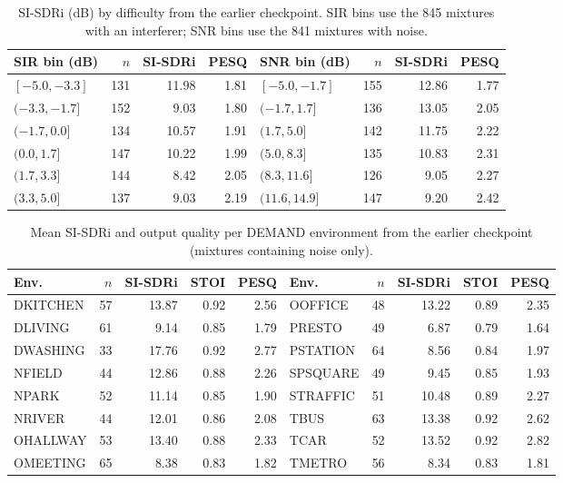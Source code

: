 \documentclass[11pt,a4paper]{article}
\newcommand{\sisdri}{SI-SDRi}
\begin{document}
\begin{table}[htbp]
\centering\footnotesize
\caption{\sisdri{} (dB) by difficulty from the earlier checkpoint. SIR bins use the 845 mixtures
with an interferer; SNR bins use the 841 mixtures with noise.}
\label{tab:difficulty}
\begin{tabular}{@{}lrrr@{\hspace{1.2cm}}lrrr@{}}
\toprule
SIR bin (dB) & $n$ & \sisdri{} & PESQ & SNR bin (dB) & $n$ & \sisdri{} & PESQ\\
\midrule
$[-5.0,-3.3]$ & 131 & 11.98 & 1.81 & $[-5.0,-1.7]$ & 155 & 12.86 & 1.77\\
$(-3.3,-1.7]$ & 152 & 9.03 & 1.80 & $(-1.7,1.7]$ & 136 & 13.05 & 2.05\\
$(-1.7,0.0]$ & 134 & 10.57 & 1.91 & $(1.7,5.0]$ & 142 & 11.75 & 2.22\\
$(0.0,1.7]$ & 147 & 10.22 & 1.99 & $(5.0,8.3]$ & 135 & 10.83 & 2.31\\
$(1.7,3.3]$ & 144 & 8.42 & 2.05 & $(8.3,11.6]$ & 126 & 9.05 & 2.27\\
$(3.3,5.0]$ & 137 & 9.03 & 2.19 & $(11.6,14.9]$ & 147 & 9.20 & 2.42\\
\bottomrule
\end{tabular}
\end{table}

\begin{table}[htbp]
\centering\footnotesize
\caption{Mean \sisdri{} and output quality per DEMAND environment from the earlier checkpoint
(mixtures containing noise only).}
\label{tab:noiseenv}
\begin{tabular}{@{}lrrrr@{\hspace{0.8cm}}lrrrr@{}}
\toprule
Env. & $n$ & \sisdri{} & STOI & PESQ & Env. & $n$ & \sisdri{} & STOI & PESQ\\
\midrule
DKITCHEN & 57 & 13.87 & 0.92 & 2.56 & OOFFICE & 48 & 13.22 & 0.89 & 2.35\\
DLIVING & 61 & 9.14 & 0.85 & 1.79 & PRESTO & 49 & 6.87 & 0.79 & 1.64\\
DWASHING & 33 & 17.76 & 0.92 & 2.77 & PSTATION & 64 & 8.56 & 0.84 & 1.97\\
NFIELD & 44 & 12.86 & 0.88 & 2.26 & SPSQUARE & 49 & 9.45 & 0.85 & 1.93\\
NPARK & 52 & 11.14 & 0.85 & 1.90 & STRAFFIC & 51 & 10.48 & 0.89 & 2.27\\
NRIVER & 44 & 12.01 & 0.86 & 2.08 & TBUS & 63 & 13.38 & 0.92 & 2.62\\
OHALLWAY & 53 & 13.40 & 0.88 & 2.33 & TCAR & 52 & 13.52 & 0.92 & 2.82\\
OMEETING & 65 & 8.38 & 0.83 & 1.82 & TMETRO & 56 & 8.34 & 0.83 & 1.81\\
\bottomrule
\end{tabular}
\end{table}
\end{document}

